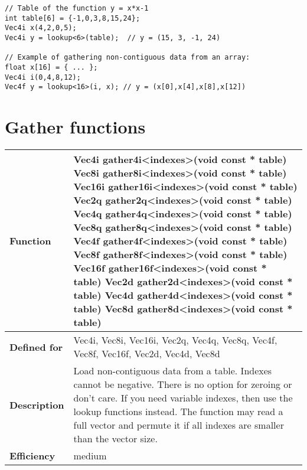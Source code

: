 \documentclass[vcl_manual.tex]{subfiles}
\begin{document}
\begin{lstlisting}[frame=none]
// Table of the function y = x*x-1
int table[6] = {-1,0,3,8,15,24};
Vec4i x(4,2,0,5);
Vec4i y = lookup<6>(table);  // y = (15, 3, -1, 24)

// Example of gathering non-contiguous data from an array:
float x[16] = { ... };
Vec4i i(0,4,8,12);
Vec4f y = lookup<16>(i, x); // y = (x[0],x[4],x[8],x[12])
\end{lstlisting}


\section{Gather functions}\label{GatherFunctions}

\begin{tabular}{|p{30mm}|p{120mm}|} \hline
\bfseries Function & 
Vec4i gather4i\textless indexes\textgreater(void const * table) \newline
Vec8i gather8i\textless indexes\textgreater(void const * table) \newline
Vec16i gather16i\textless indexes\textgreater(void const * table) \newline
Vec2q gather2q\textless indexes\textgreater(void const * table) \newline
Vec4q gather4q\textless indexes\textgreater(void const * table) \newline
Vec8q gather8q\textless indexes\textgreater(void const * table) \newline
Vec4f gather4f\textless indexes\textgreater(void const * table) \newline
Vec8f gather8f\textless indexes\textgreater(void const * table) \newline
Vec16f gather16f\textless indexes\textgreater(void const * table) \newline
Vec2d gather2d\textless indexes\textgreater(void const * table) \newline
Vec4d gather4d\textless indexes\textgreater(void const * table) \newline
Vec8d gather8d\textless indexes\textgreater(void const * table) \\ \hline
\bfseries Defined for & Vec4i, Vec8i, Vec16i, Vec2q, Vec4q, Vec8q, \newline
Vec4f, Vec8f, Vec16f, Vec2d, Vec4d, Vec8d \\ \hline
\bfseries Description & Load non-contiguous data from a table. Indexes cannot be negative. There is no option for zeroing or don't care.  \newline
If you need variable indexes, then use the lookup functions instead. \newline
The function may read a full vector and permute it if all indexes are smaller than the vector size.  \\ \hline
\bfseries Efficiency & medium \\ \hline
\end{tabular}
\end{document}
